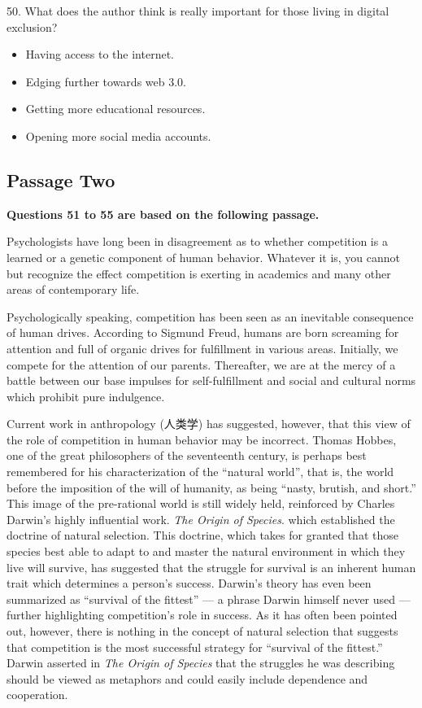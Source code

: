 \documentclass[UTF8,11pt]{ctexart}
\begin{document}
50. What does the author think is really important for those living in digital exclusion?


\begin{itemize}[leftmargin=2em,itemsep=.2em,topsep=.4em]\item[A.] Having access to the internet.
\item[B.] Edging further towards web 3.0.
\item[C.] Getting more educational resources.
\item[D.] Opening more social media accounts.
\end{itemize}

\subsection*{\textbf{Passage Two}}


\textbf{Questions 51 to 55 are based on the following passage.}


Psychologists have long been in disagreement as to whether competition is a learned or a genetic component of human behavior. Whatever it is, you cannot but recognize the effect competition is exerting in academics and many other areas of contemporary life.


Psychologically speaking, competition has been seen as an inevitable consequence of human drives. According to Sigmund Freud, humans are born screaming for attention and full of organic drives for fulfillment in various areas. Initially, we compete for the attention of our parents. Thereafter, we are at the mercy of a battle between our base impulses for self-fulfillment and social and cultural norms which prohibit pure indulgence.


Current work in anthropology (人类学) has suggested, however, that this view of the role of competition in human behavior may be incorrect. Thomas Hobbes, one of the great philosophers of the seventeenth century, is perhaps best remembered for his characterization of the “natural world”, that is, the world before the imposition of the will of humanity, as being “nasty, brutish, and short.” This image of the pre-rational world is still widely held, reinforced by Charles Darwin’s highly influential work. \textit{The Origin of Species}. which established the doctrine of natural selection. This doctrine, which takes for granted that those species best able to adapt to and master the natural environment in which they live will survive, has suggested that the struggle for survival is an inherent human trait which determines a person’s success. Darwin’s theory has even been summarized as “survival of the fittest” — a phrase Darwin himself never used — further highlighting competition’s role in success. As it has often been pointed out, however, there is nothing in the concept of natural selection that suggests that competition is the most successful strategy for “survival of the fittest.” Darwin asserted in \textit{The Origin of Species} that the struggles he was describing should be viewed as metaphors and could easily include dependence and cooperation.
\end{document}

